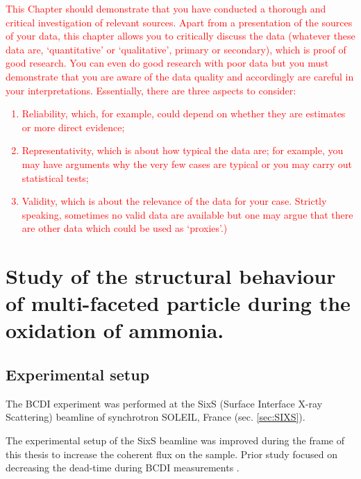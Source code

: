 \textcolor{red}{This Chapter should demonstrate that you have conducted a thorough and critical investigation of relevant sources.
Apart from a presentation of the sources of your data, this chapter allows you to critically discuss the data (whatever these data are, ‘quantitative’ or ‘qualitative’, primary or secondary), which is proof of good research. You can even do good research with poor data but you must demonstrate that you are aware of the data quality and accordingly are careful in your interpretations. Essentially, there are three aspects to consider:
\begin{enumerate}
\item	Reliability, which, for example, could depend on whether they are estimates or more direct evidence;
\item	Representativity, which is about how typical the data are; for example, you may have arguments why the very few cases are typical or you may carry out statistical tests;
\item Validity, which is about the relevance of the data for your case. Strictly speaking, sometimes no valid data are available but one may argue that there are other data which could be used as ‘proxies’.) 
\end{enumerate}
}

\section{Study of the structural behaviour of multi-faceted particle during the oxidation of ammonia.}

\subsection{Experimental setup}

The BCDI experiment was performed at the SixS (Surface Interface X-ray Scattering) beamline of synchrotron SOLEIL, France (sec. \ref{sec:SIXS}).

The experimental setup of the SixS beamline was improved during the frame of this thesis to increase the coherent flux on the sample.
Prior study focused on decreasing the dead-time during BCDI measurements \parencite{Li2020}.


